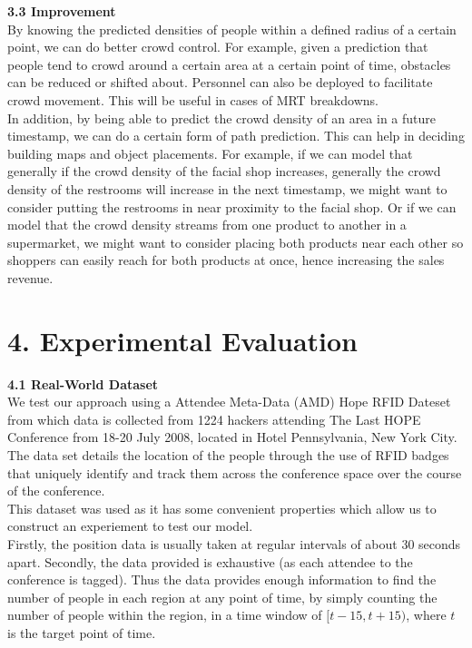 \documentclass[letterpaper]{article}
\begin{document}
{\bf3.3  Improvement} \\

By knowing the predicted densities of people within a defined radius of a certain point, we can do better crowd control. For example, given a prediction that people tend to crowd around a certain area at a certain point of time, obstacles can be reduced or shifted about. Personnel can also be deployed to facilitate crowd movement. This will be useful in cases of MRT breakdowns. \\

In addition, by being able to predict the crowd density of an area in a future timestamp, we can do a certain form of path prediction. This can help in deciding building maps and object placements. For example, if we can model that generally if the crowd density of the facial shop increases, generally the crowd density of the restrooms will increase in the next timestamp, we might want to consider putting the restrooms in near proximity to the facial shop. Or if we can model that the crowd density streams from one product to another in a supermarket, we might want to consider placing both products near each other so shoppers can easily reach for both products at once, hence increasing the sales revenue.  \\

\section{4.  Experimental Evaluation}

{\bf4.1  Real-World Dataset} \\

We test our approach using a Attendee Meta-Data (AMD) Hope RFID Dateset from which data is collected from 1224 hackers attending The Last HOPE Conference from 18-20 July 2008, located in Hotel Pennsylvania, New York City. The data set details the location of the people through the use of RFID badges that uniquely identify and track them across the conference space over the course of the conference. \\

This dataset was used as it has some convenient properties which allow us to construct an experiement to test our model.\\

Firstly, the position data is usually taken at regular intervals of about $30$ seconds apart. Secondly, the data provided is exhaustive (as each attendee to the conference is tagged). Thus the data provides enough information to find the number of people in each region at any point of time, by simply counting the number of people within the region, in a time window of $[t-15,t+15)$, where $t$ is the target point of time. \\
\end{document}
